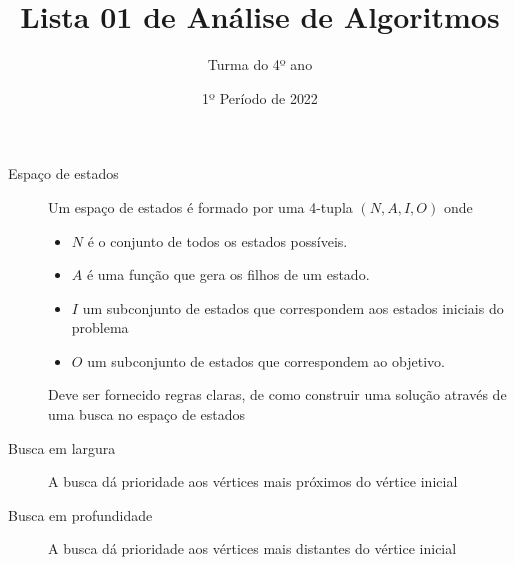 \documentclass[12pt]{article}
\title{Lista 01 de Análise de Algoritmos}
\date{1º Período de 2022}
\author{Turma do 4º ano}
\begin{document}
\begin{description}

\item[Espaço de estados]
Um espaço de estados é formado por uma 4-tupla $(N, A, I, O)$ onde
\begin{itemize}
\item $N$ é o conjunto de todos os estados possíveis.
\item $A$ é uma função que gera os filhos de um estado.
\item $I$ um subconjunto de estados que correspondem aos estados iniciais do problema
\item $O$ um subconjunto de estados que correspondem ao objetivo.
\end{itemize}
Deve ser fornecido regras claras, de como construir uma solução através de uma busca no espaço de estados

\item[Busca em largura]
A busca dá prioridade aos vértices mais próximos do vértice inicial

\item[Busca em profundidade]
A busca dá prioridade aos vértices mais distantes do vértice inicial

\end{description}

\vspace{3em}
\end{document}
